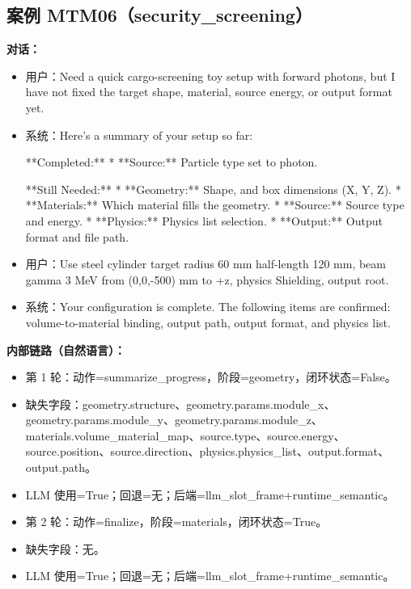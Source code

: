 \documentclass[11pt]{ctexart}
\begin{document}
\subsection{案例 MTM06（security\_screening）}
\textbf{对话：}
\begin{itemize}
\item 用户：Need a quick cargo-screening toy setup with forward photons, but I have not fixed the target shape, material, source energy, or output format yet.
\item 系统：Here's a summary of your setup so far:

**Completed:**
*   **Source:** Particle type set to photon.

**Still Needed:**
*   **Geometry:** Shape, and box dimensions (X, Y, Z).
*   **Materials:** Which material fills the geometry.
*   **Source:** Source type and energy.
*   **Physics:** Physics list selection.
*   **Output:** Output format and file path.
\item 用户：Use steel cylinder target radius 60 mm half-length 120 mm, beam gamma 3 MeV from (0,0,-500) mm to +z, physics Shielding, output root.
\item 系统：Your configuration is complete. The following items are confirmed: volume-to-material binding, output path, output format, and physics list.
\end{itemize}
\textbf{内部链路（自然语言）：}
\begin{itemize}
\item 第 1 轮：动作=summarize\_progress，阶段=geometry，闭环状态=False。
\item 缺失字段：geometry.structure、geometry.params.module\_x、geometry.params.module\_y、geometry.params.module\_z、materials.volume\_material\_map、source.type、source.energy、source.position、source.direction、physics.physics\_list、output.format、output.path。
\item LLM 使用=True；回退=无；后端=llm\_slot\_frame+runtime\_semantic。
\item 第 2 轮：动作=finalize，阶段=materials，闭环状态=True。
\item 缺失字段：无。
\item LLM 使用=True；回退=无；后端=llm\_slot\_frame+runtime\_semantic。
\end{itemize}
\end{document}
